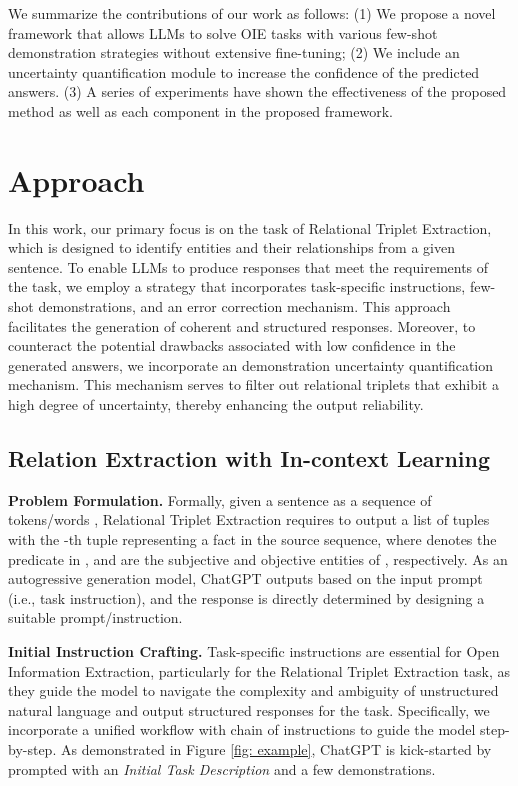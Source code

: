 \documentclass{article}
\begin{document}
We summarize the contributions of our work as follows: (1) We propose a novel framework that allows LLMs to solve OIE tasks with various few-shot demonstration strategies without extensive fine-tuning; (2) We include an uncertainty quantification module to increase the confidence of the predicted answers. (3) A series of experiments have shown the effectiveness of the proposed method as well as each component in the proposed framework.

\section{Approach}
In this work, our primary focus is on the task of Relational Triplet Extraction, which is designed to identify entities and their relationships from a given sentence. To enable LLMs to produce responses that meet the requirements of the task, we employ a strategy that incorporates task-specific instructions, few-shot demonstrations, and an error correction mechanism. This approach facilitates the generation of coherent and structured responses. Moreover, to counteract the potential drawbacks associated with low confidence in the generated answers, we incorporate an demonstration uncertainty quantification mechanism. This mechanism serves to filter out relational triplets that exhibit a high degree of uncertainty, thereby enhancing the output reliability.

\subsection{Relation Extraction with In-context Learning}
\noindent\textbf{Problem Formulation.} Formally, given a sentence as a sequence of tokens/words , Relational Triplet Extraction requires to output a list of tuples  with the -th tuple  representing a fact in the source sequence, where  denotes the predicate in ,  and  are the subjective and objective entities of , respectively. As an autogressive generation model, ChatGPT outputs  based on the input prompt (i.e., task instruction), and the response is directly determined by designing a suitable prompt/instruction. 

\noindent\textbf{Initial Instruction Crafting.} Task-specific instructions are essential for Open Information Extraction, particularly for the Relational Triplet Extraction task, as they guide the model to navigate the complexity and ambiguity of unstructured natural language and output structured responses for the task. Specifically, we incorporate a unified workflow with chain of instructions to guide the model step-by-step. As demonstrated in Figure \ref{fig: example}, ChatGPT is kick-started by prompted with an \textit{Initial Task Description} and a few demonstrations.  
\end{document}
